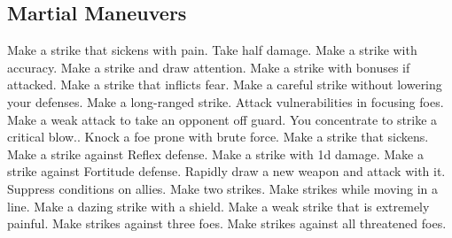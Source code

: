 \subsection{Martial Maneuvers}\label{Martial Maneuvers}
\begin{spelllist}
 Make a strike that sickens with pain.
 Take half damage.
 Make a strike with  accuracy.
 Make a strike and draw attention.
 Make a strike with bonuses if attacked.
 Make a strike that inflicts fear.
 Make a careful strike without lowering your defenses.
 Make a long-ranged strike.
 Attack vulnerabilities in focusing foes.
 Make a weak attack to take an opponent off guard.
 You concentrate to strike a critical blow..
 Knock a foe prone with brute force.
 Make a strike that sickens.
 Make a strike against Reflex defense.
 Make a strike with \plus1d damage.
 Make a strike against Fortitude defense.
 Rapidly draw a new weapon and attack with it.
 Suppress conditions on allies.
 Make two strikes.
 Make strikes while moving in a line.
 Make a dazing strike with a shield.
 Make a weak strike that is extremely painful.
 Make strikes against three foes.
 Make strikes against all threatened foes.
\end{spelllist}



\small
